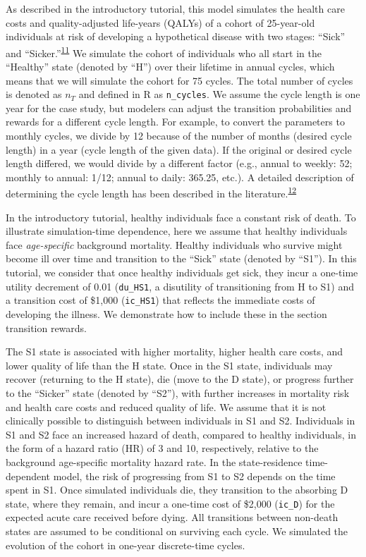 \documentclass[
]{article}
\begin{document}
As described in the introductory tutorial, this model simulates the health care costs and quality-adjusted life-years (QALYs) of a cohort of 25-year-old individuals at risk of developing a hypothetical disease with two stages: ``Sick'' and ``Sicker.''\textsuperscript{\protect\hyperlink{ref-Enns2015e}{11}} We simulate the cohort of individuals who all start in the ``Healthy'' state (denoted by ``H'') over their lifetime in annual cycles, which means that we will simulate the cohort for 75 cycles. The total number of cycles is denoted as \(n_T\) and defined in R as \texttt{n\_cycles}. We assume the cycle length is one year for the case study, but modelers can adjust the transition probabilities and rewards for a different cycle length. For example, to convert the parameters to monthly cycles, we divide by 12 because of the number of months (desired cycle length) in a year (cycle length of the given data). If the original or desired cycle length differed, we would divide by a different factor (e.g., annual to weekly: 52; monthly to annual: 1/12; annual to daily: 365.25, etc.). A detailed description of determining the cycle length has been described in the literature.\textsuperscript{\protect\hyperlink{ref-OMahony2015}{12}}

In the introductory tutorial, healthy individuals face a constant risk of death. To illustrate simulation-time dependence, here we assume that healthy individuals face \emph{age-specific} background mortality. Healthy individuals who survive might become ill over time and transition to the ``Sick'' state (denoted by ``S1''). In this tutorial, we consider that once healthy individuals get sick, they incur a one-time utility decrement of 0.01 (\texttt{du\_HS1}, a disutility of transitioning from H to S1) and a transition cost of \$1,000 (\texttt{ic\_HS1}) that reflects the immediate costs of developing the illness. We demonstrate how to include these in the section transition rewards.

The S1 state is associated with higher mortality, higher health care costs, and lower quality of life than the H state. Once in the S1 state, individuals may recover (returning to the H state), die (move to the D state), or progress further to the ``Sicker'' state (denoted by ``S2''), with further increases in mortality risk and health care costs and reduced quality of life. We assume that it is not clinically possible to distinguish between individuals in S1 and S2. Individuals in S1 and S2 face an increased hazard of death, compared to healthy individuals, in the form of a hazard ratio (HR) of 3 and 10, respectively, relative to the background age-specific mortality hazard rate. In the state-residence time-dependent model, the risk of progressing from S1 to S2 depends on the time spent in S1. Once simulated individuals die, they transition to the absorbing D state, where they remain, and incur a one-time cost of \$2,000 (\texttt{ic\_D}) for the expected acute care received before dying. All transitions between non-death states are assumed to be conditional on surviving each cycle. We simulated the evolution of the cohort in one-year discrete-time cycles.
\end{document}
